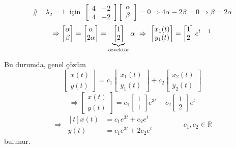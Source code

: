 \documentclass[11pt,a4paper]{article}
\begin{document}
\begin{cozum}
\[\]
\[
\# \quad \lambda_2 = 1 \ \text{ için } \ \begin{bmatrix} 4 & -2 \\ 4 & -2 \end{bmatrix}\begin{bmatrix} \alpha \\ \beta \end{bmatrix} = 0 \Rightarrow 4\alpha - 2\beta = 0 \Rightarrow \beta = 2\alpha
\]
\[
\Rightarrow \begin{bmatrix} \alpha \\ \beta \end{bmatrix} = \begin{bmatrix} \alpha \\ 2\alpha \end{bmatrix} = \underbrace{\begin{bmatrix} 1 \\ 2 \end{bmatrix}}_{\text{özvektör}} \alpha \ \Rightarrow \ \begin{bmatrix} x_1(t) \\ y_1(t) \end{bmatrix} = \begin{bmatrix} 1 \\ 2 \end{bmatrix} e^{t} \quad\text{\footnotemark}
\]

Bu durumda, genel çözüm
\[
\begin{bmatrix} x(t) \\ y(t) \end{bmatrix} = c_1\begin{bmatrix} x_1(t) \\ y_1(t) \end{bmatrix} + c_2\begin{bmatrix} x_2(t) \\ y_2(t) \end{bmatrix}
\]
\[
\Rightarrow \begin{bmatrix} x(t) \\ y(t) \end{bmatrix} = c_1\begin{bmatrix} 1 \\ 1 \end{bmatrix}e^{3t} + c_2\begin{bmatrix} 1 \\ 2 \end{bmatrix}e^{t}
\]
\[
\Rightarrow \ \begin{aligned}[t] x(t) &= c_1e^{3t} + c_2e^{t} \\ y(t) &= c_1e^{3t} + 2c_2e^{t} \end{aligned} \qquad\qquad c_1, c_2 \in \mathbb{R}
\]
bulunur.
\end{cozum}
\end{document}
